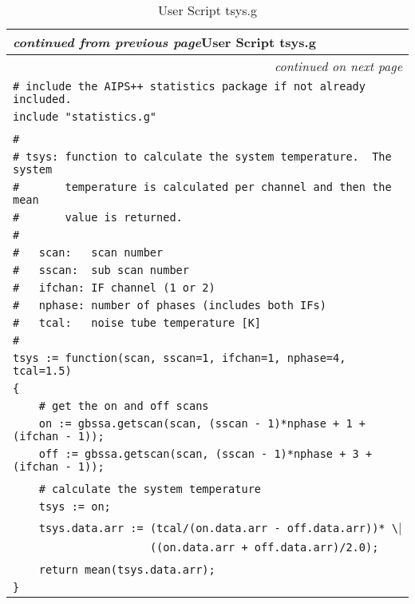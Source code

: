 \setlongtables
\begin{longtable}[c]{|l|}
\caption{User Script tsys.g}\label{tsys} \\
\cline{1-1}
\endfirsthead
\multicolumn{1}{l}{\hspace{9mm}\footnotesize{\slshape
 continued from previous page}\hfill{User Script tsys.g}} \\
\cline{1-1}
\endhead
\cline{1-1}
\multicolumn{1}{r}{\small \slshape
 continued on next page} \\
\endfoot
\cline{1-1}
\endlastfoot
{\slshape\small}
\verb|# include the AIPS++ statistics package if not already included.| \\
\verb|include "statistics.g"| \\
\verb|| \\
\verb|#| \\
\verb|# tsys: function to calculate the system temperature.  The system| \\
\verb|#       temperature is calculated per channel and then the mean| \\
\verb|#       value is returned.| \\
\verb|#   | \\
\verb|#   scan:   scan number| \\
\verb|#   sscan:  sub scan number | \\
\verb|#   ifchan: IF channel (1 or 2)| \\
\verb|#   nphase: number of phases (includes both IFs)| \\
\verb|#   tcal:   noise tube temperature [K]| \\
\verb|#   | \\
\verb|tsys := function(scan, sscan=1, ifchan=1, nphase=4, tcal=1.5)| \\
\verb|{| \\
\verb|    # get the on and off scans| \\
\verb|    on := gbssa.getscan(scan, (sscan - 1)*nphase + 1 + (ifchan - 1));| \\
\verb|    off := gbssa.getscan(scan, (sscan - 1)*nphase + 3 + (ifchan - 1));| \\
\verb|| \\
\verb|    # calculate the system temperature| \\
\verb|    tsys := on;| \\
\verb|    tsys.data.arr := (tcal/(on.data.arr - off.data.arr))* \| \\
\verb|                     ((on.data.arr + off.data.arr)/2.0);| \\
\verb|| \\
\verb|    return mean(tsys.data.arr);| \\
\verb|}| \\
\end{longtable}
